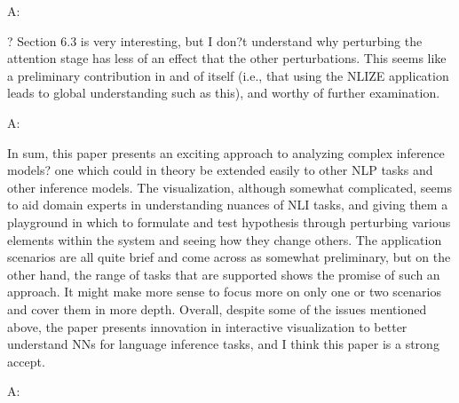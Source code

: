 A:

? Section 6.3 is very interesting, but I don?t understand why perturbing the attention stage has less of an effect that the other perturbations. This seems like a preliminary contribution in and of itself (i.e., that using the NLIZE application leads to global understanding such as this), and worthy of further examination.

A:

In sum, this paper presents an exciting approach to analyzing complex inference models? one which could in theory be extended easily to other NLP tasks and other inference models. The visualization, although somewhat complicated, seems to aid domain experts in understanding nuances of NLI tasks, and giving them a playground in which to formulate and test hypothesis through perturbing various elements within the system and seeing how they change others. The application scenarios are all quite brief and come across as somewhat preliminary, but on the other hand, the range of tasks that are supported shows the promise of such an approach. It might make more sense to focus more on only one or two scenarios and cover them in more depth. Overall, despite some of the issues mentioned above, the paper presents innovation in interactive visualization to better understand NNs for language inference tasks, and I think this paper is a strong accept.

A:



